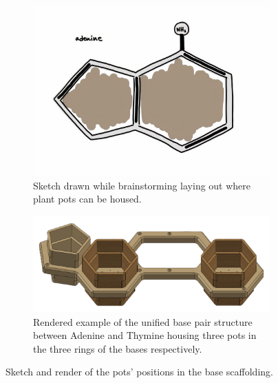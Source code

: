 \documentclass[12pt]{extarticle} %
\begin{document}
\begin{figure}[ht]
     \centering
     \begin{subfigure}[b]{0.4\textwidth}
         \centering
         \includegraphics[width=\textwidth]{images/sketches/rough_plant_pot_placement.jpeg}
         \caption{Sketch drawn while brainstorming laying out where plant pots can be housed.}
         \label{fig:adenine_sketch}
     \end{subfigure}
     \hfill
     \begin{subfigure}[b]{0.55\textwidth}
         \centering
         \includegraphics[width=\textwidth]{images/screenshots/bp_assembled.png}
         \caption{Rendered example of the unified base pair structure between Adenine and Thymine housing three pots in the three rings of the bases respectively.}
         \label{fig:bp_transparent}
     \end{subfigure}
     \caption{Sketch and render of the pots' positions in the base scaffolding.}
\end{figure}
\end{document}
